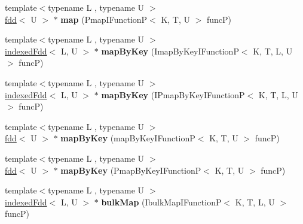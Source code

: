 \begin{DoxyCompactItemize}
\item 
\hypertarget{classfaster_1_1indexedFdd_a358249f6c4a526ad71dd1af516e1c496}{}{\footnotesize template$<$typename L , typename U $>$ }\\\hyperlink{classfaster_1_1fdd}{fdd}$<$ U $>$ $\ast$ {\bfseries map} (Pmap\+I\+Function\+P$<$ K, T, U $>$ func\+P)\label{classfaster_1_1indexedFdd_a358249f6c4a526ad71dd1af516e1c496}

\item 
\hypertarget{classfaster_1_1indexedFdd_a72e66cd0a1896a9ba95e093ea665e5f9}{}{\footnotesize template$<$typename L , typename U $>$ }\\\hyperlink{classfaster_1_1indexedFdd}{indexed\+Fdd}$<$ L, U $>$ $\ast$ {\bfseries map\+By\+Key} (Imap\+By\+Key\+I\+Function\+P$<$ K, T, L, U $>$ func\+P)\label{classfaster_1_1indexedFdd_a72e66cd0a1896a9ba95e093ea665e5f9}

\item 
\hypertarget{classfaster_1_1indexedFdd_ac1f7ce69086373cc5b419da1f8213bdd}{}{\footnotesize template$<$typename L , typename U $>$ }\\\hyperlink{classfaster_1_1indexedFdd}{indexed\+Fdd}$<$ L, U $>$ $\ast$ {\bfseries map\+By\+Key} (I\+Pmap\+By\+Key\+I\+Function\+P$<$ K, T, L, U $>$ func\+P)\label{classfaster_1_1indexedFdd_ac1f7ce69086373cc5b419da1f8213bdd}

\item 
\hypertarget{classfaster_1_1indexedFdd_a993ec5033e2f665437f5d8590794fe0b}{}{\footnotesize template$<$typename L , typename U $>$ }\\\hyperlink{classfaster_1_1fdd}{fdd}$<$ U $>$ $\ast$ {\bfseries map\+By\+Key} (map\+By\+Key\+I\+Function\+P$<$ K, T, U $>$ func\+P)\label{classfaster_1_1indexedFdd_a993ec5033e2f665437f5d8590794fe0b}

\item 
\hypertarget{classfaster_1_1indexedFdd_a558fd453f0a2ba00515359a46690972d}{}{\footnotesize template$<$typename L , typename U $>$ }\\\hyperlink{classfaster_1_1fdd}{fdd}$<$ U $>$ $\ast$ {\bfseries map\+By\+Key} (Pmap\+By\+Key\+I\+Function\+P$<$ K, T, U $>$ func\+P)\label{classfaster_1_1indexedFdd_a558fd453f0a2ba00515359a46690972d}

\item 
\hypertarget{classfaster_1_1indexedFdd_a6ace49d5739205211ba154ada93c5a06}{}{\footnotesize template$<$typename L , typename U $>$ }\\\hyperlink{classfaster_1_1indexedFdd}{indexed\+Fdd}$<$ L, U $>$ $\ast$ {\bfseries bulk\+Map} (Ibulk\+Map\+I\+Function\+P$<$ K, T, L, U $>$ func\+P)\label{classfaster_1_1indexedFdd_a6ace49d5739205211ba154ada93c5a06}


\end{DoxyCompactItemize}
